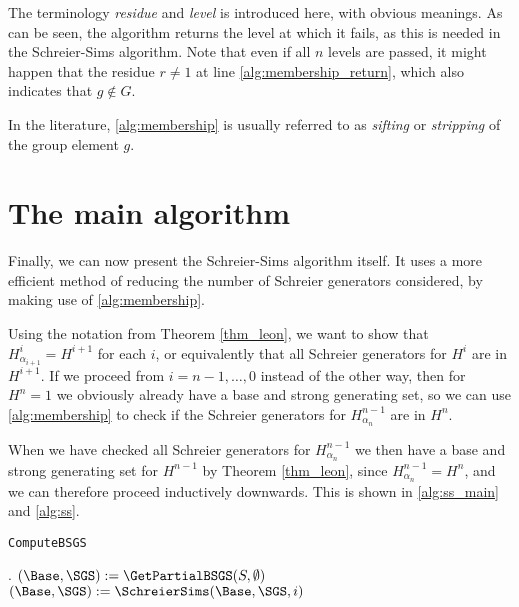 The terminology \emph{residue} and \emph{level} is introduced here,
with obvious meanings. As can be seen, the algorithm returns the level
at which it fails, as this is needed in the Schreier-Sims algorithm. Note that even if all $n$ levels are passed, it might happen that the residue $r \neq 1$ at line \ref{alg:membership_return}, which also indicates that $g \notin G$. 

In the literature, \ref{alg:membership} is usually referred to as
\emph{sifting} or \emph{stripping} of the group element $g$.

\section{The main algorithm}
Finally, we can now present the Schreier-Sims algorithm itself. It
uses a more efficient method of reducing the number of Schreier
generators considered, by making use of \ref{alg:membership}. 

Using
the notation from Theorem \ref{thm_leon}, we want to show that
$H^i_{\alpha_{i + 1}} = H^{i + 1}$ for each $i$, or equivalently that
all Schreier generators for $H^i$ are in $H^{i + 1}$. If we proceed
from $i = n - 1, \dotsc, 0$ instead of the other way, then for $H^n = 1$ we obviously already have a base and strong generating set,
so we can use \ref{alg:membership} to check if the Schreier generators
for $H^{n - 1}_{\alpha_n}$ are in $H^n$.

When we have checked all Schreier generators for $H^{n - 1}_{\alpha_n}$ we then have a
base and strong generating set for $H^{n - 1}$ by Theorem \ref{thm_leon},
since $H^{n - 1}_{\alpha_n} = H^n$, and we can therefore proceed
inductively downwards. This is shown in \ref{alg:ss_main} and \ref{alg:ss}.

\begin{algorithm} 
\dontprintsemicolon
\caption{\texttt{ComputeBSGS}}
.
\Begin
{
  $(\Base, \SGS) := \GetPartialBSGS(S, \emptyset)$ \;
  {
    $(\Base, \SGS) := \SchreierSims(\Base, \SGS, i)$ \;
  }
  \Return{$(\Base, \SGS)$}
}
\label{alg:ss_main}
\end{algorithm}

